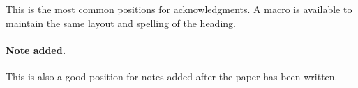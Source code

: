 \documentclass[a4paper,11pt]{article}
\begin{document}
\acknowledgments

This is the most common positions for acknowledgments. A macro is
available to maintain the same layout and spelling of the heading.

\paragraph{Note added.} This is also a good position for notes added
after the paper has been written.








\end{document}
